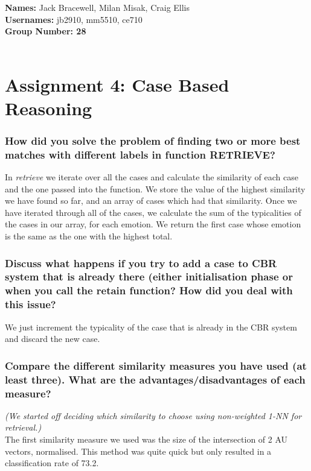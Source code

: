 \documentclass[12pt]{article}
\begin{document}
{\bf Names:} Jack Bracewell, Milan Misak, Craig Ellis \\
{\bf Usernames:} jb2910, mm5510, ce710 \\
{\bf Group Number: 28}  \\ \\

\section*{Assignment 4: Case Based Reasoning}

\subsubsection*{How did you solve the problem of finding two or more best matches with different labels in function RETRIEVE?}

In \emph{retrieve} we iterate over all the cases and calculate the similarity of each case and the one passed into the function. We store the value of the highest similarity we have found so far, and an array of cases which had that similarity. Once we have iterated through all of the cases, we calculate the sum of the typicalities of the cases in our array, for each emotion. We return the first case whose emotion is the same as the one with the highest total.

\subsubsection*{Discuss what happens if you try to add a case to CBR system that is already there (either initialisation phase or when you call the retain function? How did you deal with this issue?}

We just increment the typicality of the case that is already in the CBR system and discard the new case. 

\subsubsection*{Compare the different similarity measures you have used (at least three). What are the advantages/disadvantages of each measure?}

\emph{(We started off deciding which similarity to choose using non-weighted 1-NN for retrieval.)} \\

The first similarity measure we used was the size of the intersection of 2 AU vectors, normalised. This method was quite quick but only resulted in a classification rate of 73.2. \\ 
\end{document}

